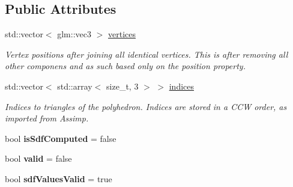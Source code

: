 \subsection*{Public Attributes}
\begin{DoxyCompactItemize}
\item 
\mbox{\label{structpepr3d_1_1_geometry_1_1_polyhedron_data_a0e592b47afdf450ed044c67fd71ff696}} 
std\+::vector$<$ glm\+::vec3 $>$ \mbox{\hyperlink{structpepr3d_1_1_geometry_1_1_polyhedron_data_a0e592b47afdf450ed044c67fd71ff696}{vertices}}
\begin{DoxyCompactList}\small\item\em Vertex positions after joining all identical vertices. This is after removing all other componens and as such based only on the position property. \end{DoxyCompactList}\item 
\mbox{\label{structpepr3d_1_1_geometry_1_1_polyhedron_data_aa05912ff343efe66a5aca55708d4a420}} 
std\+::vector$<$ std\+::array$<$ size\+\_\+t, 3 $>$ $>$ \mbox{\hyperlink{structpepr3d_1_1_geometry_1_1_polyhedron_data_aa05912ff343efe66a5aca55708d4a420}{indices}}
\begin{DoxyCompactList}\small\item\em Indices to triangles of the polyhedron. Indices are stored in a C\+CW order, as imported from Assimp. \end{DoxyCompactList}\item 
\mbox{\label{structpepr3d_1_1_geometry_1_1_polyhedron_data_ad4680fd063a9bc8f2ba2d3f173345efc}} 
bool {\bfseries is\+Sdf\+Computed} = false
\item 
\mbox{\label{structpepr3d_1_1_geometry_1_1_polyhedron_data_a93a482395c128564bf52ec26e42c852b}} 
bool {\bfseries valid} = false
\item 
\mbox{\label{structpepr3d_1_1_geometry_1_1_polyhedron_data_a24369f74b696f8b86c8962e2d2541b64}} 
bool {\bfseries sdf\+Values\+Valid} = true
\item 
\mbox{\label{structpepr3d_1_1_geometry_1_1_polyhedron_data_af684234a6d2f2525012d436991b2c737}} 

\end{DoxyCompactItemize}
